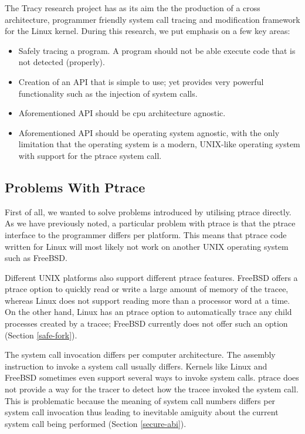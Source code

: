 \documentclass[a4paper, 10pt]{report}
\begin{document}
The Tracy research project has as its aim the the production of a cross
architecture, programmer friendly system call tracing and modification
framework for the Linux kernel.
During this research, we put emphasis on a few key areas:
\begin{itemize}
\item Safely tracing a program. A program should not be able execute code that
    is not detected (properly). %
\item Creation of an API that is simple to use; yet provides very powerful
    functionality such as the injection of system calls.
\item Aforementioned API should be cpu architecture agnostic.
\item Aforementioned API should be operating system agnostic, with the only
    limitation that the operating system is a modern, UNIX-like operating
    system with support for the ptrace system call.
\end{itemize}

\subsection{Problems With Ptrace}
First of all, we wanted to solve problems introduced by utilising ptrace
directly. As we have previously noted, a particular problem with ptrace is that
the ptrace interface to the programmer differs per platform. This means that
ptrace code written for Linux will most likely not work on another UNIX operating
system such as FreeBSD.

Different UNIX platforms also support different ptrace features. FreeBSD offers
a ptrace option to quickly read or write a large amount of memory of the
tracee, whereas Linux does not support reading more than a processor word at a
time. On the other hand, Linux has an ptrace option to automatically trace
any child processes created by a tracee; FreeBSD currently does not offer such
an option (Section \ref{safe-fork}).

The system call invocation differs per computer architecture.
The assembly instruction to invoke a system call usually differs.
Kernels like Linux and FreeBSD sometimes even support several ways to invoke
system calls. ptrace does not provide a way for the tracer to detect how
the tracee invoked the system call. This is problematic because the meaning
of system call numbers differs per system call invocation thus leading to
inevitable amiguity about the current system call being performed (Section
\ref{secure-abi}).
\end{document}
